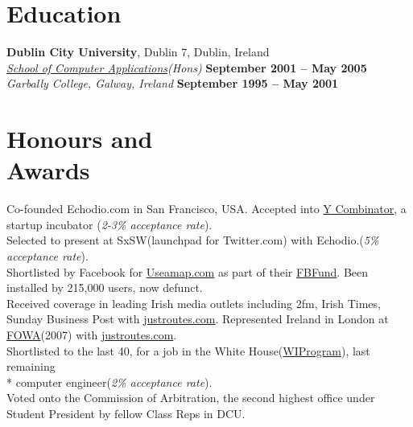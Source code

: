 \documentclass[margin,line]{resume}
\begin{document}
\begin{resume}
    \section{\mysidestyle Education}
    \textbf{Dublin City University}, Dublin 7, Dublin, Ireland \vspace{2mm}\\\vspace{1mm}%
    \textsl{\href{http://www.computing.dcu.ie}{School of Computer Applications}(Hons)} \hfill \textbf{ September 2001 -- May 2005}\\
    \textsl{Garbally College, Galway, Ireland} \hfill \textbf{September 1995 -- May 2001}\vspace{-3mm}\\\vspace{-1mm}%


    \section{\mysidestyle Honours and\\Awards} 

    Co-founded Echodio.com in San Francisco, USA. Accepted into \href{http://ycombinator.com/}{Y Combinator}, a startup incubator (\emph{2-3\% acceptance rate}).\vspace{1mm}\\%
    Selected to present at SxSW(launchpad for Twitter.com) with Echodio.(\emph{5\% acceptance rate}).\vspace{1mm}\\%
    Shortlisted by Facebook for \href{http://useamap.}{Useamap.com} as part of their \href{http://fbfund.com/about/}{FBFund}. Been installed by 215,000 users, now defunct.\vspace{1mm}\\%
    Received coverage in leading Irish media outlets including 2fm, Irish Times, Sunday Business Post with \href{http://justroutes.com}{justroutes.com}. Represented Ireland in London at \href{http://futureofwebapps.com/}{FOWA}(2007) with \href{http://justroutes.com}{justroutes.com}.\vspace{1mm}\\%
    Shortlisted to the last 40, for a job in the White House(\href{http://wiprogram.org/WIP}{WIProgram}), last remaining \\* computer engineer(\emph{2\% acceptance rate}).\vspace{1mm}\\%
    Voted onto the Commission of Arbitration, the second highest office under Student President by fellow Class Reps in DCU.\vspace{1mm}\\%


\end{resume}
\end{document}
